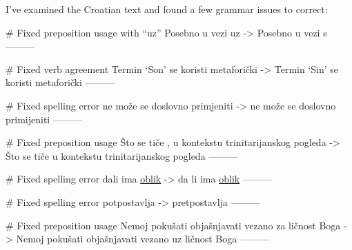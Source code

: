 I've examined the Croatian text and found a few grammar issues to correct:

# Fixed preposition usage with “uz”
Posebno u vezi uz 
->
Posebno u vezi s 
---------

# Fixed verb agreement
Termin ‘Son’ se koristi metaforički
->
Termin ‘Sin’ se koristi metaforički
---------

# Fixed spelling error
ne može se doslovno primjeniti
->
ne može se doslovno primijeniti
---------

# Fixed preposition usage
Što se tiče , u kontekstu trinitarijanskog pogleda
->
Što se tiče  u kontekstu trinitarijanskog pogleda
---------

# Fixed spelling error
dali ima \underline{oblik}
->
da li ima \underline{oblik}
---------

# Fixed spelling error
potpostavlja
->
pretpostavlja
---------

# Fixed preposition usage
Nemoj pokušati objašnjavati vezano za ličnost Boga
->
Nemoj pokušati objašnjavati vezano uz ličnost Boga
---------